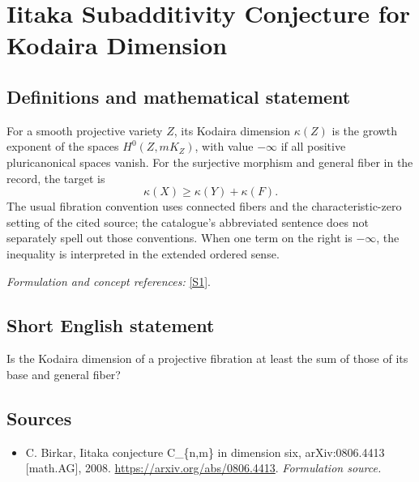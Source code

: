 \documentclass[11pt]{article}
\begin{document}
\section*{\texorpdfstring{Iitaka Subadditivity Conjecture for Kodaira Dimension}{Iitaka Subadditivity Conjecture for Kodaira Dimension}}\label{statement}
\subsection{Definitions and mathematical statement}
For a smooth projective variety $Z$, its Kodaira dimension $\kappa(Z)$ is the growth exponent of the spaces $H^0(Z,mK_Z)$, with value $-\infty$ if all positive pluricanonical spaces vanish. For the surjective morphism and general fiber in the record, the target is
\[
 \kappa(X)\ge\kappa(Y)+\kappa(F).
\]
The usual fibration convention uses connected fibers and the characteristic-zero setting of the cited source; the catalogue's abbreviated sentence does not separately spell out those conventions. When one term on the right is $-\infty$, the inequality is interpreted in the extended ordered sense.
\par\smallskip\textit{Formulation and concept references:} \href{https://arxiv.org/abs/0806.4413}{[S1]}.

\subsection{Short English statement}
Is the Kodaira dimension of a projective fibration at least the sum of those of its base and general fiber?
\subsection{Sources}
\begin{itemize}
\item[S1]C. Birkar, Iitaka conjecture C\_\{n,m\} in dimension six, arXiv:0806.4413 [math.AG], 2008.
\url{https://arxiv.org/abs/0806.4413}.
\textit{Formulation source.}
\end{itemize}
\end{document}
